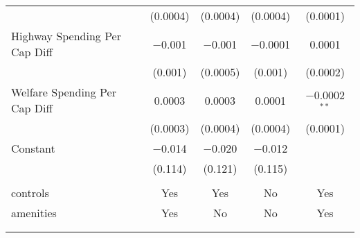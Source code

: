 \begin{table}[!htbp]
\begin{tabular}{@{\extracolsep{5pt}}lcccc}
  & (0.0004) & (0.0004) & (0.0004) & (0.0001) \\ 
  Highway Spending Per Cap Diff & $-$0.001 & $-$0.001 & $-$0.0001 & 0.0001 \\ 
  & (0.001) & (0.0005) & (0.001) & (0.0002) \\ 
  Welfare Spending Per Cap Diff & 0.0003 & 0.0003 & 0.0001 & $-$0.0002$^{**}$ \\ 
  & (0.0003) & (0.0004) & (0.0004) & (0.0001) \\ 
  Constant & $-$0.014 & $-$0.020 & $-$0.012 &  \\ 
  & (0.114) & (0.121) & (0.115) &  \\ 
 \hline \\[-1.8ex] 
controls & Yes & Yes & No & Yes \\ 
amenities & Yes & No & No & Yes \\ 
\hline \\[-1.8ex] 
\hline 
\hline \\[-1.8ex] 
\end{tabular} 
\end{table} 
